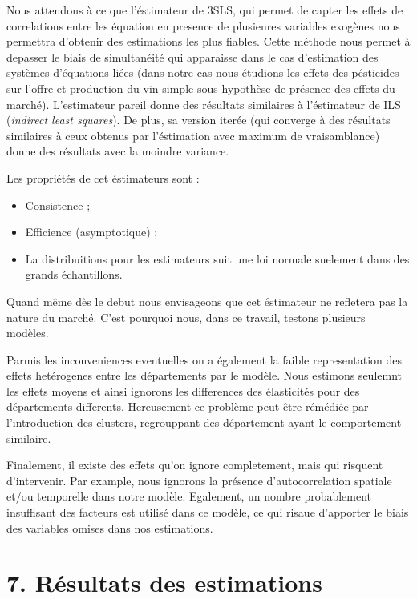 \documentclass[11pt,]{article}
\providecommand{\tightlist}{%
  \setlength{\itemsep}{0pt}\setlength{\parskip}{0pt}}
\begin{document}
Nous attendons à ce que l'éstimateur de 3SLS, qui permet de capter les
effets de correlations entre les équation en presence de plusieures
variables exogènes nous permettra d'obtenir des estimations les plus
fiables. Cette méthode nous permet à depasser le biais de simultanéité
qui apparaisse dans le cas d'estimation des systèmes d'équations liées
(dans notre cas nous étudions les effets des pésticides sur l'offre et
production du vin simple sous hypothèse de présence des effets du
marché). L'estimateur pareil donne des résultats similaires à
l'éstimateur de ILS (\emph{indirect least squares}). De plus, sa version
iterée (qui converge à des résultats similaires à ceux obtenus par
l'éstimation avec maximum de vraisamblance) donne des résultats avec la
moindre variance.

Les propriétés de cet éstimateurs sont :

\begin{itemize}
\tightlist
\item
  Consistence ;
\item
  Efficience (asymptotique) ;
\item
  La distribuitions pour les estimateurs suit une loi normale suelement
  dans des grands échantillons.
\end{itemize}

Quand même dès le debut nous envisageons que cet éstimateur ne refletera
pas la nature du marché. C'est pourquoi nous, dans ce travail, testons
plusieurs modèles.

Parmis les inconveniences eventuelles on a également la faible
representation des effets hetérogenes entre les départements par le
modèle. Nous estimons seulemnt les effets moyens et ainsi ignorons les
differences des élasticités pour des départements differents.
Hereusement ce problème peut être rémédiée par l'introduction des
clusters, regrouppant des département ayant le comportement similaire.

Finalement, il existe des effets qu'on ignore completement, mais qui
risquent d'intervenir. Par example, nous ignorons la présence
d'autocorrelation spatiale et/ou temporelle dans notre modèle.
Egalement, un nombre probablement insuffisant des facteurs est utilisé
dans ce modèle, ce qui risaue d'apporter le biais des variables omises
dans nos estimations.

\hypertarget{resultats-des-estimations}{%
\section{7. Résultats des estimations}\label{resultats-des-estimations}}
\end{document}
